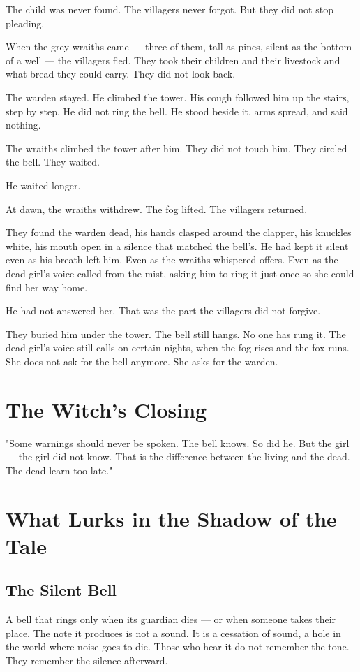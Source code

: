 The child was never found. The villagers never forgot. But they did not stop pleading.

When the grey wraiths came — three of them, tall as pines, silent as the bottom of a well — the villagers fled. They took their children and their livestock and what bread they could carry. They did not look back.

The warden stayed. He climbed the tower. His cough followed him up the stairs, step by step. He did not ring the bell. He stood beside it, arms spread, and said nothing.

The wraiths climbed the tower after him. They did not touch him. They circled the bell. They waited.

He waited longer.

At dawn, the wraiths withdrew. The fog lifted. The villagers returned.

They found the warden dead, his hands clasped around the clapper, his knuckles white, his mouth open in a silence that matched the bell's. He had kept it silent even as his breath left him. Even as the wraiths whispered offers. Even as the dead girl's voice called from the mist, asking him to ring it just once so she could find her way home.

He had not answered her. That was the part the villagers did not forgive.

They buried him under the tower. The bell still hangs. No one has rung it. The dead girl's voice still calls on certain nights, when the fog rises and the fox runs. She does not ask for the bell anymore. She asks for the warden.

\section*{The Witch's Closing}
"Some warnings should never be spoken. The bell knows. So did he. But the girl — the girl did not know. That is the difference between the living and the dead. The dead learn too late."

\section*{What Lurks in the Shadow of the Tale}

\subsection*{The Silent Bell}

A bell that rings only when its guardian dies — or when someone takes their place. The note it produces is not a sound. It is a cessation of sound, a hole in the world where noise goes to die. Those who hear it do not remember the tone. They remember the silence afterward.


